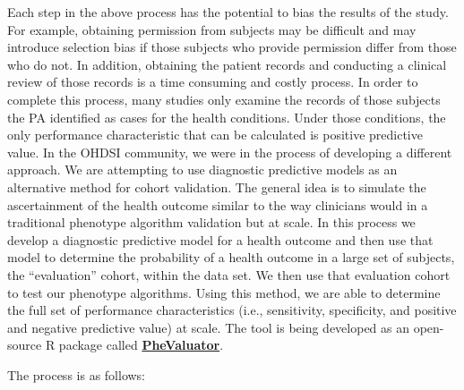 \documentclass[11pt]{book}
\theoremstyle{definition}
\theoremstyle{definition}
\theoremstyle{definition}
\theoremstyle{remark}
\begin{document}
Each step in the above process has the potential to bias the results of the study. For example, obtaining permission from subjects may be difficult and may introduce selection bias if those subjects who provide permission differ from those who do not. In addition, obtaining the patient records and conducting a clinical review of those records is a time consuming and costly process. In order to complete this process, many studies only examine the records of those subjects the PA identified as cases for the health conditions. Under those conditions, the only performance characteristic that can be calculated is positive predictive value.
In the OHDSI community, we were in the process of developing a different approach. We are attempting to use diagnostic predictive models as an alternative method for cohort validation. The general idea is to simulate the ascertainment of the health outcome similar to the way clinicians would in a traditional phenotype algorithm validation but at scale. In this process we develop a diagnostic predictive model for a health outcome and then use that model to determine the probability of a health outcome in a large set of subjects, the ``evaluation'' cohort, within the data set. We then use that evaluation cohort to test our phenotype algorithms. Using this method, we are able to determine the full set of performance characteristics (i.e., sensitivity, specificity, and positive and negative predictive value) at scale. The tool is being developed as an open-source R package called \href{https://github.com/OHDSI/PheValuator}{\textbf{PheValuator}}. 

The process is as follows:
\end{document}
